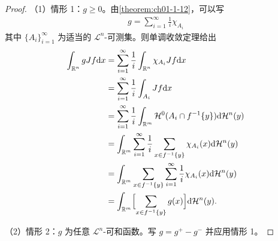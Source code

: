 \documentclass[../../main.tex]{subfiles}%
\begin{document}
\begin{proof}
（1）情形 1：$g\geqslant0$。由\cref{theorem:ch01-1-12}，可以写%
\begin{align*}
g=\sum_{i=1}^{\infty}\frac1i\chi_{A_i}
\end{align*}
其中 $\{A_i\}_{i=1}^{\infty}$ 为适当的 $\mathcal{L}^n$-可测集。则单调收敛定理给出
\begin{align*}
\int_{\mathbb{R}^n}gJf\mathrm{d} x&=\sum_{i=1}^{\infty}\frac1i\int_{\mathbb{R}^n}\chi_{A_i}Jf\mathrm{d} x\\
&=\sum_{i=1}^{\infty}\frac1i\int_{A_i}Jf\mathrm{d} x\\
&=\sum_{i=1}^{\infty}\frac1i\int_{\mathbb{R}^m}\mathcal{H}^0(A_i\cap f^{-1}\{y\})\mathrm{d}\mathcal{H}^n(y)\\
&=\int_{\mathbb{R}^m}\sum_{i=1}^{\infty}\frac1i\sum_{x\in f^{-1}\{y\}}\chi_{A_i}(x)\mathrm{d}\mathcal{H}^n(y)\\
&=\int_{\mathbb{R}^m}\sum_{x\in f^{-1}\{y\}}\sum_{i=1}^{\infty}\frac1i\chi_{A_i}(x)\mathrm{d}\mathcal{H}^n(y)\\
&=\int_{\mathbb{R}^m}\Bigl[\sum_{x\in f^{-1}\{y\}}g(x)\Bigr]\mathrm{d}\mathcal{H}^n(y).
\end{align*}

（2）情形 2：$g$ 为任意 $\mathcal{L}^n$-可和函数。写 $g=g^+-g^-$ 并应用情形 1。
\end{proof}
\end{document}
